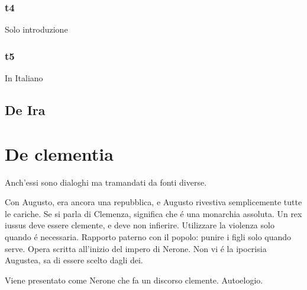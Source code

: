 \documentclass{article}
\begin{document}
\subsubsection{t4}
Solo introduzione

\subsubsection{t5}
In Italiano

\subsection{De Ira}

\section{De clementia}
Anch'essi sono dialoghi ma tramandati da fonti diverse.

Con Augusto, era ancora una repubblica, e Augusto rivestiva semplicemente tutte le cariche. Se si parla di Clemenza, significa che é una monarchia assoluta. Un rex iussus deve essere clemente, e deve non infierire. Utilizzare la violenza solo quando é necessaria. Rapporto paterno con il popolo: punire i figli solo quando serve. Opera scritta all'inizio del impero di Nerone. Non vi é la ipocrisia Augustea, sa di essere scelto dagli dei.

Viene presentato come Nerone che fa un discorso clemente. Autoelogio.
\end{document}
